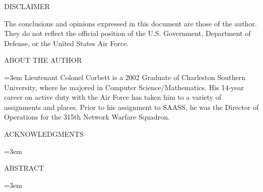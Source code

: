 \documentclass[11pt, letterpaper, titlepage]{report}
\begin{document}
\setlength{\parskip}{1em}  %
\singlespacing %
\renewcommand{\thepage}{\roman{page}}%
\setcounter{page}{1}  %

	\centering
	DISCLAIMER\\
	\vspace{2em}
	\raggedright
	The conclusions and opinions expressed in this document are those of the author.  They do not reflect the official position of the U.S. Government, Department of Defense, or the United States Air Force.
	\newpage

	\centering
	ABOUT THE AUTHOR\\
	\vspace{2em}
	\raggedright\parindent=3em
	Lieutenant Colonel Corbett is a 2002 Graduate of Charleston Southern University, where he majored in Computer Science/Mathematics.  His 14-year career on active duty with the Air Force has taken him to a variety of assignments and places.  Prior to his assignment to SAASS, he was the Director of Operations for the 315th Network Warfare Squadron.

	\newpage

	\centering
	ACKNOWLEDGMENTS\\
	\raggedright\parindent=3em
	\vspace{2em}
	
	\lipsum[1]  %
	
	\newpage

	\centering
	ABSTRACT\\
	\vspace{2em}
	\raggedright\parindent=3em

	\lipsum[1]  %

	\newpage

	\renewcommand{\contentsname}{\hfill\normalfont\large CONTENTS \hfill}
	\tableofcontents
	\newpage



\end{document}
